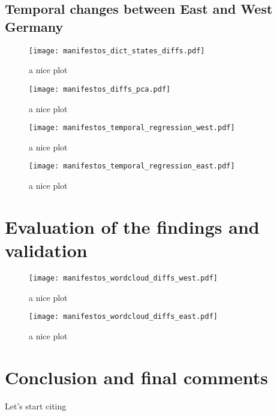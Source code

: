 \documentclass[a4paper]{scrreprt}
\begin{document}
\section{Temporal changes between East and West Germany}
\begin{figure}
    \centering
    \texttt{[image: manifestos\_dict\_states\_diffs.pdf]}
    \caption{a nice plot}
\end{figure}
\begin{figure}
    \centering
    \texttt{[image: manifestos\_diffs\_pca.pdf]}
    \caption{a nice plot}
\end{figure}
\begin{figure}
    \centering
    \texttt{[image: manifestos\_temporal\_regression\_west.pdf]}
    \caption{a nice plot}
\end{figure}
\begin{figure}
    \centering
    \texttt{[image: manifestos\_temporal\_regression\_east.pdf]}
    \caption{a nice plot}
\end{figure}
\chapter{Evaluation of the findings and validation}
\begin{figure}
    \centering
    \texttt{[image: manifestos\_wordcloud\_diffs\_west.pdf]}
    \caption{a nice plot}
\end{figure}
\begin{figure}
    \centering
    \texttt{[image: manifestos\_wordcloud\_diffs\_east.pdf]}
    \caption{a nice plot}
\end{figure}
\chapter{Conclusion and final comments}
Let's start citing \citep[p.~22]{canovan:2002}


\end{document}

